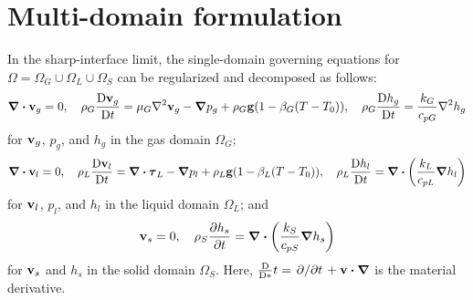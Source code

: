 \documentclass{article}
\newcommand\Dv[2][]{\frac{\mathrm{D}#1}{\mathrm{D}#2}}
\newcommand{\bv}{\vb{v}}
\newcommand{\btau}{\vb*\tau}
\begin{document}
\appendix

\section{Multi-domain formulation}

In the sharp-interface limit, the single-domain governing equations for $\Omega=\Omega_G\cup\Omega_L\cup\Omega_S$ can be regularized and decomposed as follows: 
\begin{equation}
    \div\bv_g = 0, \quad
    \rho_G\Dv[\bv_g]{t} = \mu_G\laplacian\bv_g - \grad{p_g} + \rho_G\vb{g}(1-\beta_G(T-T_0)), \quad
    \rho_G\Dv[h_g]{t} = \frac{k_G}{c_{pG}}\laplacian{h_g} 
\end{equation}
for $\bv_g$, $p_g$, and $h_g$ in the gas domain $\Omega_G$;
\begin{equation}
    \div\bv_l = 0, \quad
    \rho_L\Dv[\bv_l]{t} = \div\btau_L - \grad{p_l} + \rho_L\vb{g}(1-\beta_L(T-T_0)), \quad
    \rho_L\Dv[h_l]{t} = \div(\frac{k_L}{c_{pL}}\grad{h_l})
\end{equation}
for $\bv_l$, $p_l$, and $h_l$ in the liquid domain $\Omega_L$; and
\begin{equation}
    \bv_s = 0, \quad \rho_S\pdv{h_s}{t} = \div(\frac{k_S}{c_{pS}}\grad{h_s})
\end{equation}
for $\bv_s$ and $h_s$ in the solid domain $\Omega_S$.
Here, $\Dv*{t} = \pdv*{t} + \bv\vdot\grad$ is the material derivative.
\end{document}

